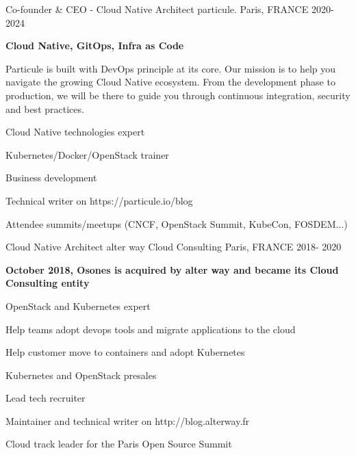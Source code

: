 \begin{cventries}
\cventry
    {Co-founder \& CEO - Cloud Native Architect} %
    {particule.} %
    {Paris, FRANCE} %
    {2020-2024} %
    {
      \begin{cvitems} %
      \item {\textbf{Cloud Native, GitOps, Infra as Code}}
      \item {Particule is built with DevOps principle at its core. Our mission
        is to help you navigate the growing Cloud Native ecosystem. From the
          development phase to production, we will be there to guide you
          through continuous integration, security and best practices.}
        \item {Cloud Native technologies expert}
        \item {Kubernetes/Docker/OpenStack trainer}
        \item {Business development}
        \item {Technical writer on https://particule.io/blog}
        \item {Attendee summits/meetups (CNCF, OpenStack Summit, KubeCon, FOSDEM...)}
      \end{cvitems}
    }
\vspace{0.5cm}


  \cventry
    {Cloud Native Architect} %
    {alter way Cloud Consulting} %
    {Paris, FRANCE} %
    {2018- 2020} %
    {
      \begin{cvitems} %
      \item {\textbf{October 2018, Osones is acquired by alter way and became
        its Cloud Consulting entity}}
      \item {OpenStack and Kubernetes expert}
      \item {Help teams adopt devops tools and migrate applications to the
        cloud}
      \item {Help customer move to containers and adopt Kubernetes}
      \item {Kubernetes and OpenStack presales}
      \item {Lead tech recruiter}
      \item {Maintainer and technical writer on http://blog.alterway.fr}
      \item {Cloud track leader for the Paris Open Source Summit}
      \end{cvitems}
    }
\vspace{0.5cm}



\end{cventries}
